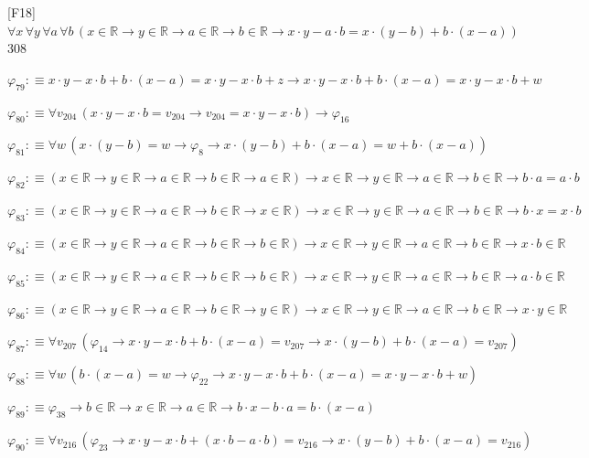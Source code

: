 \begin{fullproof}{[F18]}{$\forall x\,\forall y\,\forall a\,\forall b\,(x \in \mathbb{R} \to y \in \mathbb{R} \to a \in \mathbb{R} \to b \in \mathbb{R} \to x \cdot y - a \cdot b = x \cdot (y - b) + b \cdot (x - a))$}{308}
\begin{abbrevlist}
\item $\varphi_{79} :\equiv x \cdot y - x \cdot b + b \cdot (x - a) = x \cdot y - x \cdot b + z \to x \cdot y - x \cdot b + b \cdot (x - a) = x \cdot y - x \cdot b + w$
\item $\varphi_{80} :\equiv \forall v_{204}\,(x \cdot y - x \cdot b = v_{204} \to v_{204} = x \cdot y - x \cdot b) \to \varphi_{16}$
\item $\varphi_{81} :\equiv \forall w\,(x \cdot (y - b) = w \to \varphi_{8} \to x \cdot (y - b) + b \cdot (x - a) = w + b \cdot (x - a))$
\item $\varphi_{82} :\equiv (x \in \mathbb{R} \to y \in \mathbb{R} \to a \in \mathbb{R} \to b \in \mathbb{R} \to a \in \mathbb{R}) \to x \in \mathbb{R} \to y \in \mathbb{R} \to a \in \mathbb{R} \to b \in \mathbb{R} \to b \cdot a = a \cdot b$
\item $\varphi_{83} :\equiv (x \in \mathbb{R} \to y \in \mathbb{R} \to a \in \mathbb{R} \to b \in \mathbb{R} \to x \in \mathbb{R}) \to x \in \mathbb{R} \to y \in \mathbb{R} \to a \in \mathbb{R} \to b \in \mathbb{R} \to b \cdot x = x \cdot b$
\item $\varphi_{84} :\equiv (x \in \mathbb{R} \to y \in \mathbb{R} \to a \in \mathbb{R} \to b \in \mathbb{R} \to b \in \mathbb{R}) \to x \in \mathbb{R} \to y \in \mathbb{R} \to a \in \mathbb{R} \to b \in \mathbb{R} \to x \cdot b \in \mathbb{R}$
\item $\varphi_{85} :\equiv (x \in \mathbb{R} \to y \in \mathbb{R} \to a \in \mathbb{R} \to b \in \mathbb{R} \to b \in \mathbb{R}) \to x \in \mathbb{R} \to y \in \mathbb{R} \to a \in \mathbb{R} \to b \in \mathbb{R} \to a \cdot b \in \mathbb{R}$
\item $\varphi_{86} :\equiv (x \in \mathbb{R} \to y \in \mathbb{R} \to a \in \mathbb{R} \to b \in \mathbb{R} \to y \in \mathbb{R}) \to x \in \mathbb{R} \to y \in \mathbb{R} \to a \in \mathbb{R} \to b \in \mathbb{R} \to x \cdot y \in \mathbb{R}$
\item $\varphi_{87} :\equiv \forall v_{207}\,(\varphi_{14} \to x \cdot y - x \cdot b + b \cdot (x - a) = v_{207} \to x \cdot (y - b) + b \cdot (x - a) = v_{207})$
\item $\varphi_{88} :\equiv \forall w\,(b \cdot (x - a) = w \to \varphi_{22} \to x \cdot y - x \cdot b + b \cdot (x - a) = x \cdot y - x \cdot b + w)$
\item $\varphi_{89} :\equiv \varphi_{38} \to b \in \mathbb{R} \to x \in \mathbb{R} \to a \in \mathbb{R} \to b \cdot x - b \cdot a = b \cdot (x - a)$
\item $\varphi_{90} :\equiv \forall v_{216}\,(\varphi_{23} \to x \cdot y - x \cdot b + (x \cdot b - a \cdot b) = v_{216} \to x \cdot (y - b) + b \cdot (x - a) = v_{216})$

\end{abbrevlist}
\end{fullproof}
